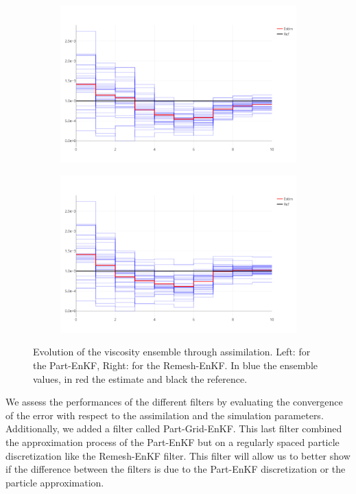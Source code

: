 \begin{figure}[htbp]
	\centering
	\begin{subfigure}{0.49\linewidth}
		\includegraphics*[width=\linewidth]{images/app2d/visc_ppf.png}
	\end{subfigure}
	\begin{subfigure}{0.49\linewidth}
		\includegraphics*[width=\linewidth]{images/app2d/visc_rmf.png}
	\end{subfigure}
	\caption{Evolution of the viscosity ensemble through assimilation. Left: for the Part-EnKF, Right: for the Remesh-EnKF. In blue the ensemble values, in red the estimate and black the reference.}
	\label{fig:visc_time}
\end{figure}

We assess the performances of the different filters by evaluating the convergence of the error with respect to the assimilation and the simulation parameters. Additionally, we added a filter called Part-Grid-EnKF. This last filter combined the approximation process of the Part-EnKF but on a regularly spaced particle discretization like the Remesh-EnKF filter. This filter will allow us to better show if the difference between the filters is due to the Part-EnKF discretization or the particle approximation.

